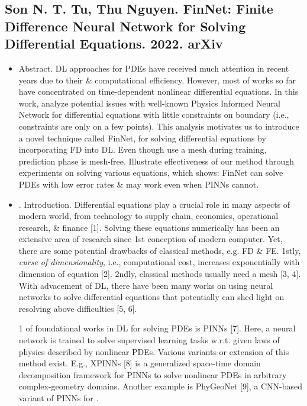 \documentclass{article}
\begin{document}
\subsection{{\sc Son N. T. Tu, Thu Nguyen}. FinNet: Finite Difference Neural Network for Solving Differential Equations. 2022. arXiv}
{\sf[2 citations]}
\begin{itemize}
	\item {\sf Abstract.} DL approaches for PDEs have received much attention in recent years due to their  \& computational efficiency. However, most of works so far have concentrated on time-dependent nonlinear differential equations. In this work, analyze potential issues with well-known Physics Informed Neural Network for differential equations with little constraints on boundary (i.e., constraints are only on a few points). This analysis motivates us to introduce a novel technique called FinNet, for solving differential equations by incorporating FD into DL. Even though use a mesh during training, prediction phase is mesh-free. Illustrate effectiveness of our method through experiments on solving various equations, which shows: FinNet can solve PDEs with low error rates \& may work even when PINNs cannot.
	\item {. Introduction.} Differential equations play a crucial role in many aspects of modern world, from technology to supply chain, economics, operational research, \& finance [1]. Solving these equations numerically has been an extensive area of research since 1st conception of modern computer. Yet, there are some potential drawbacks of classical methods, e.g. FD \& FE. 1stly, {\it curse of dimensionality}, i.e., computational cost, increases exponentially with dimension of equation [2]. 2ndly, classical methods usually need a mesh [3, 4]. With advacement of DL, there have been many works on using neural networks to solve differential equations that potentially can shed light on resolving above difficulties [5, 6].
	
	1 of foundational works in DL for solving PDEs is PINNs [7]. Here, a neural network is trained to solve supervised learning tasks w.r.t. given laws of physics described by nonlinear PDEs. Various variants or extension of this method exist. E.g., XPINNs [8] is a generalized space-time domain decomposition framework for PINNs to solve nonlinear PDEs in arbitrary complex-geometry domains. Another example is PhyGeoNet [9], a CNN-based variant of PINNs for .
	

\end{itemize}
\end{document}
